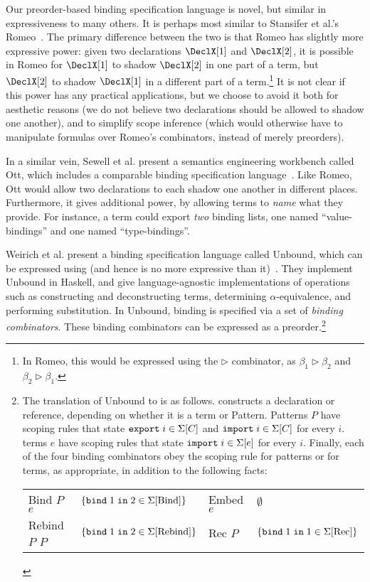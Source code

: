 Our preorder-based binding specification language is novel, but
similar in expressiveness to many others.  It is perhaps most similar
to Stansifer et al.'s Romeo~\cite{stansifer-romeo}.
The primary difference between the two is that
Romeo has slightly more expressive power: given two declarations
$\DeclX[1]$ and $\DeclX[2]$, it is possible in Romeo for $\DeclX[1]$
to shadow $\DeclX[2]$ in one part of a term, but $\DeclX[2]$ to shadow
$\DeclX[1]$ in a different part of a term.\footnote{
  In Romeo, this would be expressed using the $\rhd$ combinator,
  as $\beta_1 \rhd \beta_2$ and $\beta_2 \rhd \beta_1$.
} It is not clear
if this power has any practical applications, but we choose to avoid
it both for aesthetic reasons (we do not believe two declarations
should be allowed to shadow one another), and to simplify scope
inference (which would otherwise have to manipulate formulas over
Romeo's combinators, instead of merely preorders).

In a similar vein, Sewell et al. present a semantics engineering
workbench called Ott, which includes a comparable binding
specification language~\cite{sewell-ott-jfp}. Like Romeo, Ott would allow two declarations
to each shadow one another in different places. Furthermore, it gives
additional power, by allowing terms to \emph{name} what they provide.
For instance, a term could export \emph{two} binding lists, one named
``value-bindings'' and one named ``type-bindings''.

Weirich et al. present a binding specification language called
Unbound, which can be expressed using {\sap} (and
hence is no more expressive than it)~\cite{weirich-scope}.
They implement Unbound in Haskell, and give language-agnostic
implementations of operations such as constructing and deconstructing
terms, determining $\alpha$-equivalence, and performing substitution.
In Unbound, binding is specified via a set of \emph{binding combinators}.
  These binding combinators can be expressed as a preorder.\footnote{
  The translation of Unbound to {\sap} is as follows. 
  constructs a declaration or reference, depending on whether it is a
  term or Pattern. Patterns $P$ have scoping rules that state
  $\SigPExpt{i}$ and $\SigPImpt{i}$ for every $i$. terms $e$ have
  scoping rules that state $\SigImpt{e}{i}$ for every $i$. Finally,
  each of the four binding combinators obey the scoping rule for
  patterns or for terms, as appropriate, in addition to the following
  facts:
  \begin{center}
  \begin{tabular}{l l @{\quad} l l}
    Bind $P$ $e$   & $\{\SigBind{\text{Bind}}{2}{1}\}$ &
    Embed $e$      & $\emptyset$ \\
    Rebind $P$ $P$ & $\{\SigBind{\text{Rebind}}{2}{1}\}$ &
    Rec $P$        & $\{\SigBind{\text{Rec}}{1}{1}\}$
  \end{tabular}
  \end{center}
}

